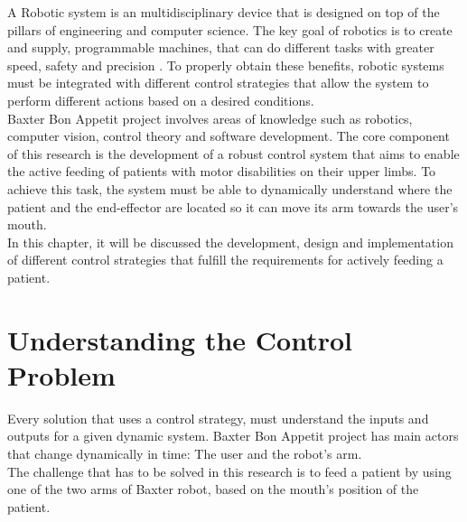 \documentclass[11pt]{report} %
\begin{document}
A Robotic system is an multidisciplinary device that is designed on top of the pillars of  engineering and computer science. The key goal of robotics is to create and supply, programmable machines, that can do different tasks with greater speed, safety and precision \citep{cite_towards_data_science}. To properly obtain these benefits, robotic systems must be integrated with different control strategies that allow the system to perform different actions based on a desired conditions.\\

Baxter Bon Appetit project involves areas of knowledge such as robotics, computer vision, control theory and software development. The core component of this research is the development of a robust control system that aims to enable the active feeding of patients with motor disabilities on their upper limbs. To achieve this task, the system must be able to dynamically understand where the patient and the end-effector are located so it can move its arm towards the user's mouth.\\ 

In this chapter, it will be discussed the development, design and implementation of different control strategies that fulfill the requirements for actively feeding a patient.\\

\section{Understanding the Control Problem}
Every solution that uses a control strategy, must understand the inputs and outputs for a given dynamic system. Baxter Bon Appetit project has main actors that change dynamically in time: The user and the robot's arm.\\

The challenge that has to be solved in this research is to feed a patient by using one of the two arms of Baxter robot, based on the mouth's position of the patient.\\
\end{document}
